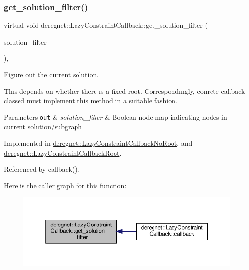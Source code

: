 \subsubsection{\texorpdfstring{get\+\_\+solution\+\_\+filter()}{get\_solution\_filter()}}
{\footnotesize\ttfamily virtual void deregnet\+::\+Lazy\+Constraint\+Callback\+::get\+\_\+solution\+\_\+filter (\begin{DoxyParamCaption}\item[{\hyperlink{namespacederegnet_a50db1f8fc7c6a954d825d9e1ed9ad302}{Node\+Filter} \&}]{solution\+\_\+filter }\end{DoxyParamCaption})\hspace{0.3cm}{\ttfamily [private]}, {}}



Figure out the current solution. 

This depends on whether there is a fixed root. Correspondingly, conrete callback classed must implement this method in a suitable fashion.


\begin{DoxyParams}[1]{Parameters}
\mbox{\tt out}  & {\em solution\+\_\+filter} & Boolean node map indicating nodes in current solution/subgraph \\
\hline
\end{DoxyParams}


Implemented in \hyperlink{classderegnet_1_1LazyConstraintCallbackNoRoot_a80686ee58b84bb1c73af6f7eddb50db6}{deregnet\+::\+Lazy\+Constraint\+Callback\+No\+Root}, and \hyperlink{classderegnet_1_1LazyConstraintCallbackRoot_afae052e08a40da4a0af8b35887b8715e}{deregnet\+::\+Lazy\+Constraint\+Callback\+Root}.



Referenced by callback().

Here is the caller graph for this function\+:\nopagebreak
\begin{figure}[H]
\begin{center}
\leavevmode
\includegraphics[width=350pt]{classderegnet_1_1LazyConstraintCallback_aebc9854e98523c99d3f856ff71bb86fb_icgraph}
\end{center}
\end{figure}
\mbox{\label{classderegnet_1_1LazyConstraintCallback_a3eb6c682c8e1129036f1218513d6feb0}} 
